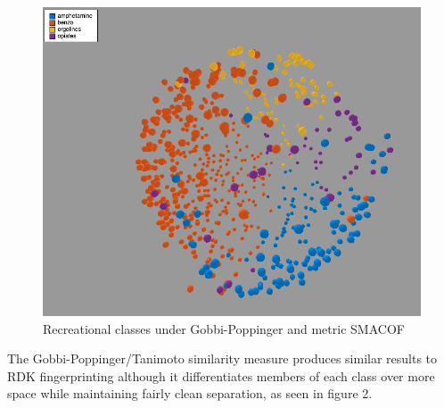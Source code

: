 \documentclass[12pt]{article}
\begin{document}
\begin{figure}[H]
  \centering
  \includegraphics[width=\textwidth]{rec-gobbi-mds}
  \captionsetup{justification=centering}
  \caption{Recreational classes under Gobbi-Poppinger and metric SMACOF}
\end{figure}

The Gobbi-Poppinger/Tanimoto similarity measure produces similar results to RDK fingerprinting although it differentiates members of each class over more space while maintaining fairly clean separation, as seen in figure 2.
\end{document}
